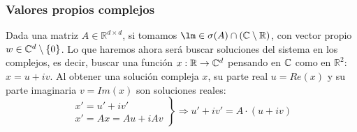 \subsubsection{Valores propios complejos}
Dada una matriz $A\in \mathbb{R}^{d\times d}$, si tomamos $\lm \in \sigma(A)\cap (\bb{C}\setminus\bb{R})$, con vector propio $w\in \mathbb{C}^d\setminus \{0\}$. Lo que haremos ahora será buscar soluciones del sistema en los complejos, es decir, buscar una función $x:\mathbb{R}\rightarrow\mathbb{C}^d$ pensando en $\mathbb{C}$ como en $\mathbb{R}^2$: $x = u + iv$. Al obtener una solución compleja $x$, su parte real $u = Re(x)$ y su parte imaginaria $v = Im(x)$ son soluciones reales:
\begin{equation*}
    \left.\begin{array}{r}
        x' = u' + iv' \\
        x' = Ax = Au + iAv
    \end{array}\right\} \Longrightarrow u' + iv' = A\cdot (u+iv)
\end{equation*}

